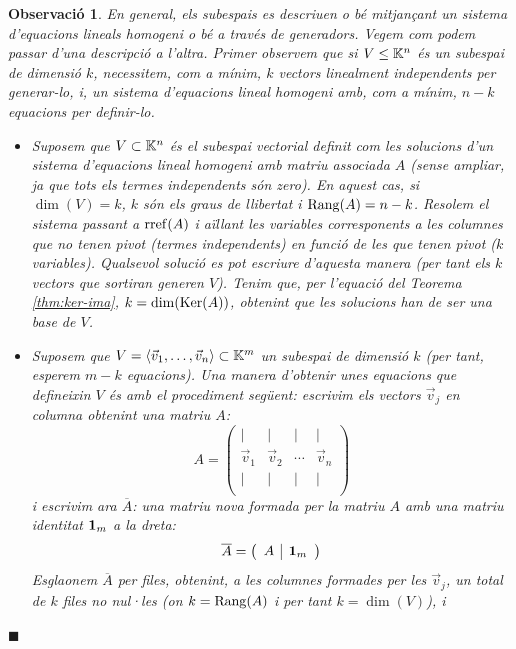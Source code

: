 \documentclass[
  11pt,
]{book}
\numberwithin{dummy}{section}
\theoremstyle{maincolornumbox}
\newtheorem{remarkT}{Observació}[chapter]
\theoremstyle{blacknumex}
\theoremstyle{blacknumbox}
\theoremstyle{maincolornum}
\newenvironment{remark}{\begin{remarkT}}{\hfill{\tiny\ensuremath{\blacksquare}}\end{remarkT}}
\newlength\esp
\begin{document}
\begin{remark}

En general, els subespais es descriuen o bé mitjançant un sistema
d'equacions lineals homogeni o bé a través de generadors. Vegem com
podem passar d'una descripció a l'altra. Primer observem que si
\(V\leq \mathbb{K}^n\) és un subespai de dimensió \(k\), necessitem, com a mínim,
\(k\) vectors linealment independents per generar-lo, i, un sistema
d'equacions lineal homogeni amb, com a mínim, \(n-k\) equacions per
definir-lo.

\begin{itemize}
\item
  Suposem que \(V\subset\mathbb{K}^n\) és el subespai vectorial definit com les
  solucions d'un sistema d'equacions lineal homogeni amb matriu
  associada \(A\) (sense ampliar, ja que tots els termes independents
  són zero). En aquest cas, si \(\dim(V)=k\), \(k\) són els graus de
  llibertat i \(\operatorname{Rang}(A)=n-k\). Resolem el sistema passant a \(\operatorname{rref}(A)\)
  i aïllant les variables corresponents a les columnes que no tenen
  pivot (termes independents) en funció de les que tenen pivot (\(k\)
  variables). Qualsevol solució es pot escriure d'aquesta manera (per
  tant els \(k\) vectors que sortiran generen \(V\)). Tenim que, per
  l'equació del Teorema
  \ref{thm:ker-ima}, \(k=\dim(\operatorname{Ker}(A))\), obtenint que les
  solucions han de ser una base de \(V\).
\item
  Suposem que
  \(V=\langle \vec v_1, \dots, \vec v_n\rangle \subset \mathbb{K}^m\) un
  subespai de dimensió \(k\) (per tant, esperem \(m-k\) equacions). Una
  manera d'obtenir unes equacions que defineixin \(V\) és amb el
  procediment següent: escrivim els vectors \(\vec v_j\) en columna
  obtenint una matriu \(A\): \[A=\left(\begin{array}{cccc}
      \mid & \mid &\mid & \mid \\
      \vec v_1 & \vec v_2 &\cdots& \vec v_n \\
      \mid & \mid &\mid & \mid \\
      \end{array}\right)\] i escrivim ara \(\overline A\): una matriu
  nova formada per la matriu \(A\) amb una matriu identitat \(\mathbf{1}_m\) a la
  dreta: \[\overline A=
      \left(\begin{array}{c|c}
      A & \mathbf{1}_m\\
      \end{array}\right)\] Esglaonem \(\overline A\) per files,
  obtenint, a les columnes formades per les \(\vec v_j\), un total de
  \(k\) files no nul·les (on \(k=\operatorname{Rang}(A)\) i per tant \(k=\dim(V)\)), i

\end{itemize}
\end{remark}
\end{document}
